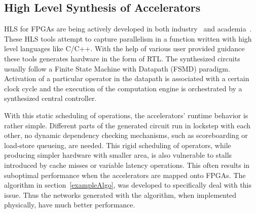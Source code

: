 \documentclass{sig-alternate}
\begin{document}
\subsection{High Level Synthesis of Accelerators}
\label{pre2}
HLS for FPGAs are being actively developed in both industry~\cite{tools:vivadohls} and academia~\cite{tools:legup}.
These HLS tools attempt to capture parallelism in a function written with high level languages like C/C++. With the help of various user provided guidance these tools generates hardware in the form of RTL. 
The synthesized circuits usually follow a Finite State Machine with Datapath (FSMD) paradigm. Activation of a particular operator in the datapath is associated
with a certain clock cycle and the execution of the computation engine is orchestrated by a synthesized central controller. 

With this static scheduling of operations, the accelerators' runtime behavior is rather simple. Different parts
of the generated circuit run in lockstep with each other, no dynamic dependency checking mechanisms,
such as scoreboarding or load-store queueing, are needed.
This rigid scheduling of operators, while producing simpler hardware with smaller area,
is also vulnerable to stalls introduced by cache misses or variable latency operations.
This often results in suboptimal performance when the accelerators
are mapped onto FPGAs. The algorithm in section~\ref{exampleAlgo}, was developed to
specifically deal with this issue. Thus the networks generated with the algorithm, when implemented physically, have much better performance. 

\end{document}

